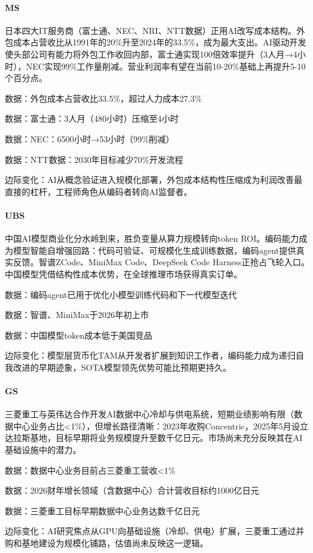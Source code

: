 \documentclass[11pt]{ctexart}
\begin{document}
\paragraph{MS} 日本四大IT服务商（富士通、NEC、NRI、NTT数据）正用AI改写成本结构。外包成本占营收比从1991年的20\%升至2024年的33.5\%，成为最大支出。AI驱动开发使头部公司有能力将外包工作收回内部，富士通实现100倍效率提升（3人月→4小时），NEC实现99\%工作量削减。营业利润率有望在当前10-20\%基础上再提升5-10个百分点。
{\small\color{refgray}数据：外包成本占营收比33.5\%，超过人力成本27.3\%\par}
{\small\color{refgray}数据：富士通：3人月（480小时）压缩至4小时\par}
{\small\color{refgray}数据：NEC：6500小时→53小时（99\%削减）\par}
{\small\color{refgray}数据：NTT数据：2030年目标减少70\%开发流程\par}
{\small\color{refgray}边际变化：AI从概念验证进入规模化部署，外包成本结构性压缩成为利润改善最直接的杠杆，工程师角色从编码者转向AI监督者。\par}
\paragraph{UBS} 中国AI模型商业化分水岭到来，胜负变量从算力规模转向token ROI。编码能力成为模型智能自增强回路：代码可验证、可规模化生成训练数据，编码agent提供真实反馈。智谱ZCode、MiniMax Code、DeepSeek Code Harness正抢占飞轮入口。中国模型凭借结构性成本优势，在全球推理市场获得真实订单。
{\small\color{refgray}数据：编码agent已用于优化小模型训练代码和下一代模型迭代\par}
{\small\color{refgray}数据：智谱、MiniMax于2026年初上市\par}
{\small\color{refgray}数据：中国模型token成本低于美国竞品\par}
{\small\color{refgray}边际变化：模型层货币化TAM从开发者扩展到知识工作者，编码能力成为递归自我改进的早期迹象，SOTA模型领先优势可能比预期更持久。\par}
\paragraph{GS} 三菱重工与英伟达合作开发AI数据中心冷却与供电系统，短期业绩影响有限（数据中心业务占比<1\%），但增长路径清晰：2023年收购Concentric，2025年5月设立达拉斯基地，目标早期将业务规模提升至数千亿日元。市场尚未充分反映其在AI基础设施中的潜力。
{\small\color{refgray}数据：数据中心业务目前占三菱重工营收<1\%\par}
{\small\color{refgray}数据：2026财年增长领域（含数据中心）合计营收目标约1000亿日元\par}
{\small\color{refgray}数据：三菱重工目标早期数据中心业务达数千亿日元\par}
{\small\color{refgray}边际变化：AI研究焦点从GPU向基础设施（冷却、供电）扩展，三菱重工通过并购和基地建设为规模化铺路，估值尚未反映这一逻辑。\par}
\end{document}
